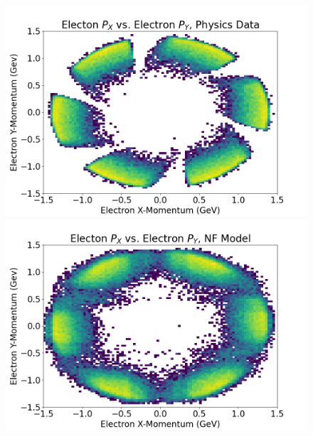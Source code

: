 \begin{figure}[!ht]
\begin{minipage}{0.23\textwidth}
    \end{minipage}
     \begin{minipage}{0.23\textwidth}
            \centering
            \includegraphics[width=.99\textwidth,trim={0 0 0 0},clip]{FinalPictures/Hists2D/Electon_P_X_vs_Electron_P_Y,_Physics_Data.png}
            \includegraphics[width=.99\textwidth,trim={0 0 0 0},clip]{FinalPictures/Hists2D/Electon_P_X_vs_Electron_P_Y,_NF_Model.png}


\end{minipage}
\end{figure}
